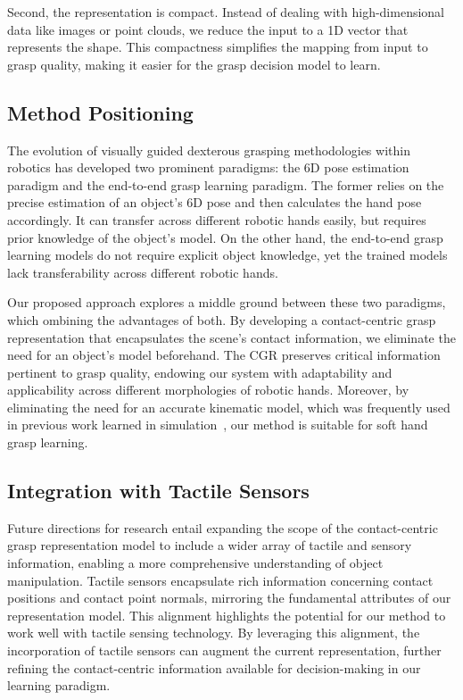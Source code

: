 Second, the representation is compact. Instead of dealing with high-dimensional data like images or point clouds, we reduce the input to a 1D vector that represents the shape. This compactness simplifies the mapping from input to grasp quality, making it easier for the grasp decision model to learn.

\subsection{Method Positioning}

The evolution of visually guided dexterous grasping methodologies within robotics has developed two prominent paradigms: the 6D pose estimation paradigm and the end-to-end grasp learning paradigm. The former relies on the precise estimation of an object's 6D pose and then calculates the hand pose accordingly. It can transfer across different robotic hands easily, but requires prior knowledge of the object's model. On the other hand, the end-to-end grasp learning models do not require explicit object knowledge, yet the trained models lack transferability across different robotic hands.

Our proposed approach explores a middle ground between these two paradigms, which ombining the advantages of both. By developing a contact-centric grasp representation that encapsulates the scene's contact information, we eliminate the need for an object's model beforehand. The CGR preserves critical information pertinent to grasp quality, endowing our system with adaptability and applicability across different morphologies of robotic hands. Moreover, by eliminating the need for an accurate kinematic model, which was frequently used in previous work learned in simulation~\cite{xu2023unidexgrasp,wan2023unidexgrasp++}, our method is suitable for soft hand grasp learning.


\subsection{Integration with Tactile Sensors}
Future directions for research entail expanding the scope of the contact-centric grasp representation model to include a wider array of tactile and sensory information, enabling a more comprehensive understanding of object manipulation. Tactile sensors encapsulate rich information concerning contact positions and contact point normals, mirroring the fundamental attributes of our representation model. This alignment highlights the potential for our method to work well with tactile sensing technology. By leveraging this alignment, the incorporation of tactile sensors can augment the current representation, further refining the contact-centric information available for decision-making in our learning paradigm. 




